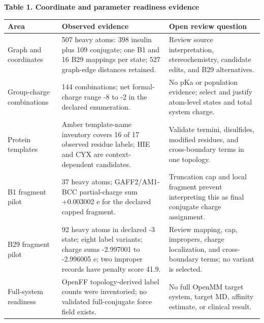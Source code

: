 \documentclass[11pt]{article}
\begin{document}
\begin{center}\begin{minipage}{\textwidth}
\small\textbf{Table 1. Coordinate and parameter readiness evidence}\par\smallskip
\centering\begin{tabularx}{\textwidth}{>{\raggedright\arraybackslash}p{} X X}\toprule

Area & Observed evidence & Open review question \\ \midrule

Graph and coordinates & 507 heavy atoms: 398 insulin plus 109 conjugate; one B1 and 16 B29 mappings per state; 527 graph-edge distances retained. & Review source interpretation, stereochemistry, candidate edits, and B29 alternatives. \\

Group-charge combinations & 144 combinations; net formal-charge range -8 to -2 in the declared enumeration. & No pKa or population evidence; select and justify atom-level states and total system charge. \\

Protein templates & Amber template-name inventory covers 16 of 17 observed residue labels; HIE and CYX are context-dependent candidates. & Validate termini, disulfides, modified residues, and cross-boundary terms in one topology. \\

B1 fragment pilot & 37 heavy atoms; GAFF2/AM1-BCC partial-charge sum +0.003002 e for the declared capped fragment. & Truncation cap and local fragment prevent interpreting this as final conjugate charge assignment. \\

B29 fragment pilot & 92 heavy atoms in declared -3 state; eight label variants; charge sums -2.997001 to -2.996005 e; two improper records have penalty score 41.9. & Review mapping, cap, impropers, charge localization, and cross-boundary terms; no variant is selected. \\

Full-system readiness & OpenFF topology-derived label counts were inventoried; no validated full-conjugate force field exists. & No full OpenMM target system, target MD, affinity estimate, or clinical result. \\

\bottomrule\end{tabularx}
\end{minipage}\end{center}
\end{document}
